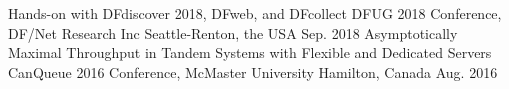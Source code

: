 
\begin{cventries}

\cventry
{Hands-on with DFdiscover 2018, DFweb, and DFcollect} %
{DFUG 2018 Conference, DF/Net Research Inc} %
{Seattle-Renton, the USA} %
{Sep. 2018} %
{}
\cventry
{Asymptotically Maximal Throughput in Tandem Systems with Flexible and Dedicated Servers} %
{CanQueue 2016 Conference, McMaster University} %
{Hamilton, Canada} %
{Aug. 2016} %
{}
\end{cventries}
